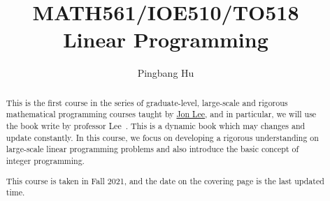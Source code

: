\documentclass[a4paper]{report}
\author{Pingbang Hu}
\title{MATH561/IOE510/TO518\\Linear Programming}
\begin{document}
\maketitle

\begin{abstract}
	This is the first course in the series of graduate-level, large-scale and rigorous mathematical programming courses taught by \href{https://sites.google.com/site/jonleewebpage/}{Jon Lee}, and in particular, we will use the book write by professor Lee~\cite{Linear-Opt}. This is a dynamic book which may changes and update constantly. In this course, we focus on developing a rigorous understanding on large-scale linear programming problems and also introduce the basic concept of integer programming.

	\vfill
	This course is taken in Fall 2021, and the date on the covering page is the last updated time.
\end{abstract}

\tableofcontents

\newpage



% 

\newpage
\printbibliography
\end{document}
